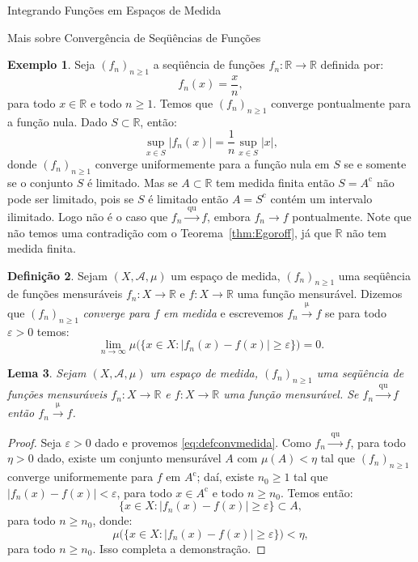 \documentclass[oneside,final,11pt]{amsbook}
\newcommand{\R}{\mathds R}
\newcommand{\compl}{\mathrm c}
\newcommand{\To}[1]{\xrightarrow{\;\mathrm{#1}\;}}
\theoremstyle{remark}\newtheorem{exercise}{Exercício}[chapter]
\theoremstyle{remark}\newtheorem{*exercise}[exercise]{\hbox to 0pt{\hskip 0pt minus 1fil*}Exercício}
\theoremstyle{definition}\newtheorem{exdefin}{Definição}[chapter]
\theoremstyle{plain}\newtheorem{teo}{Teorema}[section]
\theoremstyle{plain}\newtheorem{lem}[teo]{Lema}
\theoremstyle{plain}\newtheorem{prop}[teo]{Proposição}
\theoremstyle{plain}\newtheorem{cor}[teo]{Corolário}
\theoremstyle{definition}\newtheorem{defin}[teo]{Definição}
\theoremstyle{remark}\newtheorem{rem}[teo]{Observação}
\theoremstyle{definition}\newtheorem{notation}[teo]{Notação}
\theoremstyle{definition}\newtheorem{convention}[teo]{Convenção}
\theoremstyle{definition}\newtheorem{example}[teo]{Exemplo}
\numberwithin{section}{chapter}
\numberwithin{equation}{section}
\begin{document}
\begin{chapter}{Integrando Funções em Espaços de Medida}
\begin{section}{Mais sobre Convergência de Seqüências de Funções}
\begin{example}
Seja $(f_n)_{n\ge1}$ a seqüência de funções $f_n:\R\to\R$ definida por:
\[f_n(x)=\frac xn,\]
para todo $x\in\R$ e todo $n\ge1$.
Temos que $(f_n)_{n\ge1}$ converge pontualmente para a função nula. Dado $S\subset\R$, então:
\[\sup_{x\in S}\big\vert f_n(x)\big\vert=\frac1n\sup_{x\in S}\vert x\vert,\]
donde $(f_n)_{n\ge1}$ converge uniformemente para a função nula em $S$ se e somente se o conjunto $S$ é limitado.
Mas se $A\subset\R$ tem medida finita então $S=A^\compl$ não pode ser limitado, pois se $S$ é limitado então
$A=S^\compl$ contém um intervalo ilimitado. Logo não é o caso que $f_n\To{qu}f$, embora $f_n\to f$ pontualmente.
Note que não temos uma contradição com o Teorema~\ref{thm:Egoroff}, já que $\R$ não tem medida finita.
\end{example}

\begin{defin}
Sejam $(X,\mathcal A,\mu)$ um espaço de medida, $(f_n)_{n\ge1}$ uma seqüência de funções mensuráveis $f_n:X\to\R$
e $f:X\to\R$ uma função mensurável. Dizemos que $(f_n)_{n\ge1}$ {\em converge para $f$ em medida\/}%
e escrevemos $f_n\To\mu f$\index[simbolos]{$f_n\To\mu f$} se para todo $\varepsilon>0$ temos:
\begin{equation}\label{eq:defconvmedida}
\lim_{n\to\infty}\mu\Big(\big\{x\in X:\big\vert f_n(x)-f(x)\big\vert\ge\varepsilon\big\}\Big)=0.
\end{equation}
\end{defin}

\begin{lem}\label{thm:convquimplmu}
Sejam $(X,\mathcal A,\mu)$ um espaço de medida, $(f_n)_{n\ge1}$ uma se\-qüên\-cia de funções mensuráveis $f_n:X\to\R$
e $f:X\to\R$ uma função mensurável. Se $f_n\To{qu}f$ então $f_n\To\mu f$.
\end{lem}
\begin{proof}
Seja $\varepsilon>0$ dado e provemos \eqref{eq:defconvmedida}. Como $f_n\To{qu}f$, para todo $\eta>0$ dado,
existe um conjunto mensurável $A$ com $\mu(A)<\eta$ tal que $(f_n)_{n\ge1}$ converge uniformemente para $f$
em $A^\compl$; daí, existe $n_0\ge1$ tal que $\vert f_n(x)-f(x)\vert<\varepsilon$, para todo $x\in A^\compl$
e todo $n\ge n_0$. Temos então:
\[\big\{x\in X:\big\vert f_n(x)-f(x)\big\vert\ge\varepsilon\big\}\subset A,\]
para todo $n\ge n_0$, donde:
\[\mu\Big(\big\{x\in X:\big\vert f_n(x)-f(x)\big\vert\ge\varepsilon\big\}\Big)<\eta,\]
para todo $n\ge n_0$. Isso completa a demonstração.
\end{proof}


\end{section}
\end{chapter}
\end{document}
